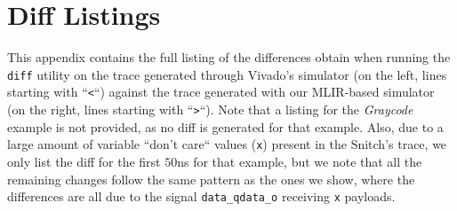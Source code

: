 \chapter{Diff Listings}
\label{app:diffs}

This appendix contains the full listing of the differences obtain when running the \texttt{diff} utility on the trace generated through Vivado's simulator (on the left, lines starting with “\texttt{<}“) against the trace generated with our MLIR-based simulator (on the right, lines starting with “\texttt{>}“). Note that a listing for the \textit{Graycode} example is not provided, as no diff is generated for that example. Also, due to a large amount of variable “don't care“ values (\texttt{x}) present in the Snitch's trace, we only list the diff for the first $50$ns for that example, but we note that all the remaining changes follow the same pattern as the ones we show, where the differences are all due to the signal \texttt{data\_qdata\_o} receiving \texttt{x} payloads.





